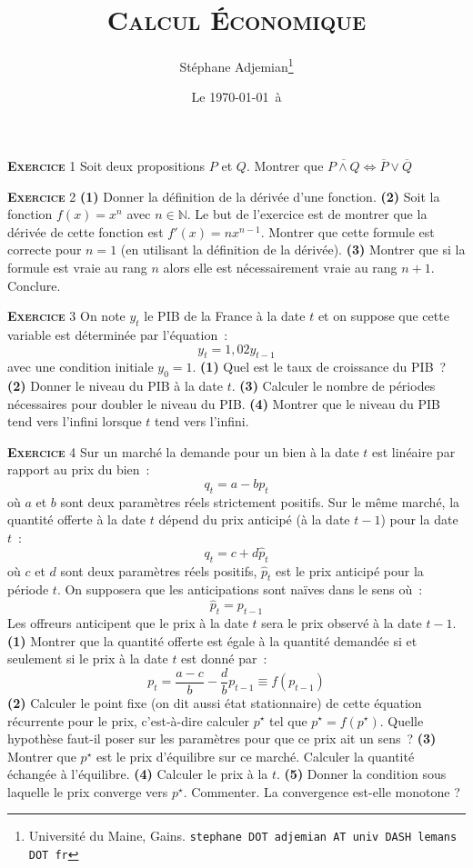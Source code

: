 \documentclass[10pt,a4paper,notitlepage]{article}
\newcommand{\exercice}[1]{\textsc{\textbf{Exercice}} #1}
\begin{document}
\title{\textsc{Calcul Économique}}
\author{Stéphane Adjemian\thanks{Université du Maine, Gains. \texttt{stephane DOT adjemian AT univ DASH lemans DOT fr}}}
\date{Le \today\ à \thistime}

\maketitle

\exercice{1} Soit deux propositions $P$ et $Q$. Montrer que $\overline
{P \land Q} \Leftrightarrow \overline{P} \lor \overline{Q}$ 

\bigskip

\exercice{2} \textbf{(1)} Donner la définition de la dérivée d'une
fonction. \textbf{(2)} Soit la fonction $f(x) = x^n$ avec
$n\in\mathbb N$. Le but de l'exercice est de montrer que la dérivée de
cette fonction est $f'(x) = nx^{n-1}$. Montrer que cette formule est
correcte pour $n=1$ (en utilisant la définition de la
dérivée). \textbf{(3)} Montrer que si la formule est vraie au rang $n$
alors elle est nécessairement vraie au rang $n+1$. Conclure.

\bigskip

\exercice{3} On note $y_t$ le PIB de la France à la date $t$ et on
suppose que cette variable est déterminée par  l'équation :
\[
y_t = 1,02 y_{t-1}
\]
avec une condition initiale $y_0 = 1$. \textbf{(1)} Quel est le taux
de croissance du PIB ? \textbf{(2)} Donner le niveau du PIB à la date
$t$. \textbf{(3)} Calculer le nombre de périodes nécessaires pour
doubler le niveau du PIB. \textbf{(4)} Montrer que le
niveau du PIB tend vers l'infini lorsque $t$ tend vers l'infini.

\bigskip

\exercice{4} Sur un marché la demande pour un bien à la date $t$ est linéaire par
rapport au prix du bien :
\[
q_t = a - b p_t
\]
où $a$ et $b$ sont deux paramètres réels strictement positifs. Sur le même marché,
la quantité offerte à la date $t$ dépend du prix anticipé (à la date
$t-1$) pour la date $t$ :
\[
q_t = c + d \hat p_t
\]
où $c$ et $d$ sont deux paramètres réels positifs, $\hat p_t$ est le
prix anticipé pour la période $t$. On supposera que les anticipations
sont naïves dans le sens où :
\[
\hat p_t = p_{t-1}
\]
Les offreurs anticipent que le prix à la date $t$ sera le prix observé
à la date $t-1$. \textbf{(1)} Montrer que la quantité offerte est
égale à la quantité demandée si et seulement si le prix à la date $t$
est donné par :
\[
p_t = \frac{a-c}{b} - \frac{d}{b} p_{t-1} \equiv f(p_{t-1})
\]
\textbf{(2)} Calculer le point fixe (on dit aussi état stationnaire)
de cette équation récurrente pour le prix, c'est-à-dire calculer
$p^{\star}$ tel que $p^{\star} = f(p^{\star})$. Quelle hypothèse
faut-il poser sur les paramètres pour que ce prix ait un sens ? \textbf{(3)}
Montrer que $p^{\star}$ est le prix d'équilibre sur ce
marché. Calculer la quantité échangée à l'équilibre. \textbf{(4)}
Calculer le prix à la $t$. \textbf{(5)} Donner la condition sous
laquelle le prix converge vers $p^{\star}$. Commenter. La convergence
est-elle monotone ?
\end{document}
